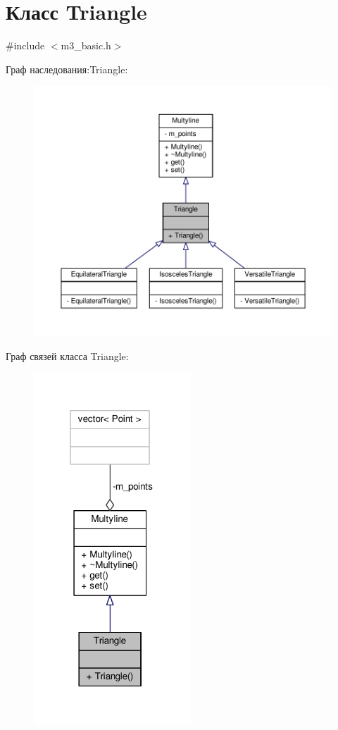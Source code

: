 \hypertarget{class_triangle}{\section{Класс Triangle}
\label{class_triangle}
}


{\ttfamily \#include $<$m3\-\_\-basic.\-h$>$}



Граф наследования\-:Triangle\-:
\nopagebreak
\begin{figure}[H]
\begin{center}
\leavevmode
\includegraphics[width=350pt]{class_triangle__inherit__graph}
\end{center}
\end{figure}


Граф связей класса Triangle\-:
\nopagebreak
\begin{figure}[H]
\begin{center}
\leavevmode
\includegraphics[width=167pt]{class_triangle__coll__graph}
\end{center}
\end{figure}
